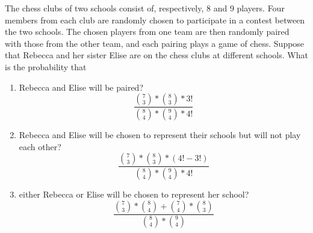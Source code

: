\item The chess clubs of two schools consist of, respectively, 8 and 9 players. Four members from each club are randomly chosen to participate in a contest between the two schools. The chosen players from one team are then randomly paired with those from the other team, and each pairing plays a game of chess. Suppose that Rebecca and her sister Elise are on the chess clubs at different schools. What is the probability that
\begin{enumerate}
    \item Rebecca and Elise will be paired?
    \[ \frac{\binom{7}{3} * \binom{8}{3} * 3!}{\binom{8}{4} * \binom{9}{4} * 4!} \]
    \item Rebecca and Elise will be chosen to represent their schools but will not play each other?
    \[ \frac{\binom{7}{3} * \binom{8}{3} * (4! - 3!)}{\binom{8}{4} * \binom{9}{4} * 4!} \]
    \item either Rebecca or Elise will be chosen to represent her school?
    \[ \frac{\binom{7}{3} * \binom{8}{4} + \binom{7}{4} * \binom{8}{3}}{\binom{8}{4} * \binom{9}{4}}\]
\end{enumerate}